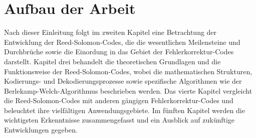 \section{Aufbau der Arbeit}\label{sec:stucture}

Nach dieser Einleitung folgt im zweiten Kapitel eine Betrachtung der Entwicklung der Reed-Solomon-Codes, die die wesentlichen Meilensteine und Durchbrüche sowie die Einordung in das Gebiet der Fehlerkorrektur-Codes darstellt. 
Kapitel drei behandelt die theoretischen Grundlagen und die Funktionsweise der Reed-Solomon-Codes, wobei die mathematischen Strukturen, Kodierungs- und Dekodierungsprozesse sowie spezifische Algorithmen wie der Berlekamp-Welch-Algorithmus beschrieben werden. 
Das vierte Kapitel vergleicht die Reed-Solomon-Codes mit anderen gängigen Fehlerkorrektur-Codes und beleuchtet ihre vielfältigen Anwendungsgebiete. 
Im fünften Kapitel werden die wichtigsten Erkenntnisse zusammengefasst und ein Ausblick auf zukünftige Entwicklungen gegeben.
